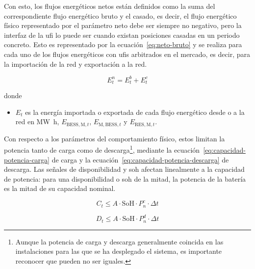 Con esto, los flujos energéticos netos están definidos como la suma del correspondiente flujo energético bruto y el casado, es decir, el flujo energético físico representado por el parámetro neto debe ser siempre no negativo, pero la interfaz de la \gls{ufi} lo puede ser cuando existan posiciones casadas en un periodo concreto. Esto es representado por la ecuación~\ref{eq:neto-bruto} y se realiza para cada uno de los flujos energéticos con \glspl{ufi} arbitrados en el mercado, es decir, para la importación de la red y exportación a la red.

\begin{samepage}

  \begin{equation}%
    \label{eq:neto-bruto}
    E^{n}_{t} = E^{b}_{t} + E^{c}_{t}
  \end{equation}

  donde

  \begin{itemize}

    \item \( E_{t} \) es la energía importada o exportada de cada flujo energético desde o a la red en \si{{\mega\watt\hour}}, \( E_{\text{BESS}, \text{M}, t} \), \( E_{\text{M}, \text{BESS}, t} \) y \( E_{\text{RES}, \text{M}, t} \).

  \end{itemize}

\end{samepage}

Con respecto a los parámetros del comportamiento físico, estos limitan la potencia tanto de carga como de descarga\footnote{Aunque la potencia de carga y descarga generalmente coincida en las instalaciones para las que se ha desplegado el sistema, es importante reconocer que pueden no ser iguales.}, mediante la ecuación~\ref{eq:capacidad-potencia-carga} de carga y la ecuación~\ref{eq:capacidad-potencia-descarga} de descarga. Las señales de disponibilidad y \gls{soh} afectan linealmente a la capacidad de potencia: para una disponibilidad o \gls{soh} de la mitad, la potencia de la batería es la mitad de su capacidad nominal.

\begin{equation}%
  \label{eq:capacidad-potencia-carga}
  C_{t} \le A \cdot \text{SoH} \cdot P^{c}_{n} \cdot \Delta t
\end{equation}

\begin{equation}%
  \label{eq:capacidad-potencia-descarga}
  D_{t} \le A \cdot \text{SoH} \cdot P^{d}_{n} \cdot \Delta t
\end{equation}

